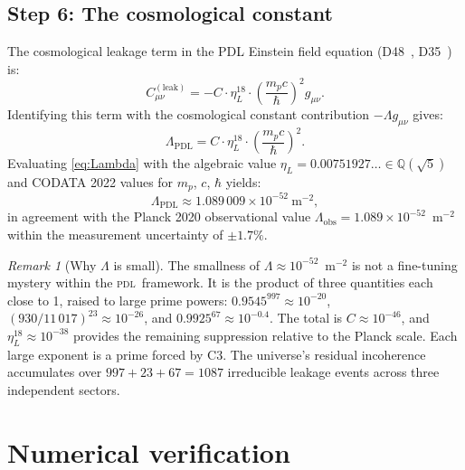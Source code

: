 \documentclass[12pt,a4paper]{article}
\theoremstyle{plain}
\theoremstyle{definition}
\theoremstyle{remark}
\newtheorem{remark}[theorem]{Remark}
\newcommand{\hb}{\hbar}
\newcommand{\PDL}{\textsc{pdl}}
\newcommand{\etaL}{\eta_L}
\newcommand{\Lam}{\Lambda}
\begin{document}
\subsection{Step 6: The cosmological constant}
\label{subsec:Lambda}

The cosmological leakage term in the PDL Einstein field equation (D48~\cite{PDL_D48_2026}, D35~\cite{PDL_D35_2026}) is:
\begin{equation}
C^{(\mathrm{leak})}_{\mu\nu} = -C \cdot \etaL^{18} \cdot \left(\frac{m_p c}{\hb}\right)^2 g_{\mu\nu}.
\label{eq:Cleak}
\end{equation}
Identifying this term with the cosmological constant contribution $-\Lam g_{\mu\nu}$ gives:
\begin{equation}
\Lam_{\mathrm{PDL}} = C \cdot \etaL^{18} \cdot \left(\frac{m_p c}{\hb}\right)^2.
\label{eq:Lambda}
\end{equation}
Evaluating \eqref{eq:Lambda} with the algebraic value $\etaL = 0.00751927\ldots \in \mathbb{Q}(\sqrt{5})$ and CODATA 2022 values for $m_p$, $c$, $\hb$ yields:
\begin{equation}
\Lam_{\mathrm{PDL}} \approx 1.089\,009 \times 10^{-52}\ \mathrm{m}^{-2},
\label{eq:Lambda_num}
\end{equation}
in agreement with the Planck 2020 observational value $\Lam_{\mathrm{obs}} = 1.089 \times 10^{-52}$~m$^{-2}$~\cite{Planck2020} within the measurement uncertainty of $\pm 1.7\%$.

\begin{remark}[Why $\Lambda$ is small]
\label{rem:small}
The smallness of $\Lambda \approx 10^{-52}$~m$^{-2}$ is not a fine-tuning mystery within the \PDL\ framework. It is the product of three quantities each close to 1, raised to large prime powers: $0.9545^{997} \approx 10^{-20}$, $(930/11\,017)^{23} \approx 10^{-26}$, and $0.9925^{67} \approx 10^{-0.4}$. The total is $C \approx 10^{-46}$, and $\etaL^{18} \approx 10^{-38}$ provides the remaining suppression relative to the Planck scale. Each large exponent is a prime forced by C3. The universe's residual incoherence accumulates over $997 + 23 + 67 = 1087$ irreducible leakage events across three independent sectors.
\end{remark}

\section{Numerical verification}
\label{sec:numerical}
\end{document}

